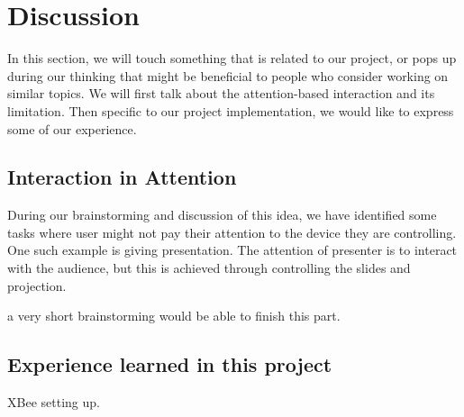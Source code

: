 
\section{Discussion}
\label{sec:discussion}

In this section, we will touch something that is related to our project, or pops up during our thinking that might be beneficial to people who consider working on similar topics. We will first talk about the attention-based interaction and its limitation. Then specific to our project implementation, we would like to express some of our experience.

\subsection{Interaction in Attention}
\label{sec:inter-attent}

During our brainstorming and discussion of this idea, we have identified some tasks where user might not pay their attention to the device they are controlling. One such example is giving presentation. The attention of presenter is to interact with the audience, but this is achieved through controlling the slides and projection.

{\color{red} a very short brainstorming would be able to finish this part.}


\subsection{Experience learned in this project}
\label{sec:exper-learn-this}

XBee setting up. 

